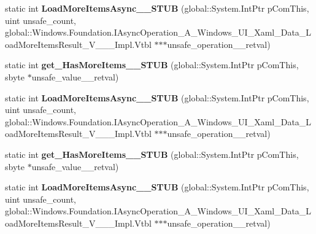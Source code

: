 \begin{DoxyCompactItemize}
static int {\bfseries Load\+More\+Items\+Async\+\_\+\+\_\+\+S\+T\+UB} (global\+::\+System.\+Int\+Ptr p\+Com\+This, uint unsafe\+\_\+count, global\+::\+Windows.\+Foundation.\+I\+Async\+Operation\+\_\+\+A\+\_\+\+Windows\+\_\+\+U\+I\+\_\+\+Xaml\+\_\+\+Data\+\_\+\+Load\+More\+Items\+Result\+\_\+\+V\+\_\+\+\_\+\+\_\+\+Impl.\+Vtbl $\ast$$\ast$$\ast$unsafe\+\_\+operation\+\_\+\+\_\+retval)
\item 
\mbox{\label{struct_windows_1_1_u_i_1_1_xaml_1_1_data_1_1_i_support_incremental_loading_____impl_1_1_vtbl_ae881f5715c03ffea730fd44d74b4735e}} 
static int {\bfseries get\+\_\+\+Has\+More\+Items\+\_\+\+\_\+\+S\+T\+UB} (global\+::\+System.\+Int\+Ptr p\+Com\+This, sbyte $\ast$unsafe\+\_\+value\+\_\+\+\_\+retval)
\item 
\mbox{\label{struct_windows_1_1_u_i_1_1_xaml_1_1_data_1_1_i_support_incremental_loading_____impl_1_1_vtbl_a40d8957bf7163031d2d5247bc6fc8ef7}} 
static int {\bfseries Load\+More\+Items\+Async\+\_\+\+\_\+\+S\+T\+UB} (global\+::\+System.\+Int\+Ptr p\+Com\+This, uint unsafe\+\_\+count, global\+::\+Windows.\+Foundation.\+I\+Async\+Operation\+\_\+\+A\+\_\+\+Windows\+\_\+\+U\+I\+\_\+\+Xaml\+\_\+\+Data\+\_\+\+Load\+More\+Items\+Result\+\_\+\+V\+\_\+\+\_\+\+\_\+\+Impl.\+Vtbl $\ast$$\ast$$\ast$unsafe\+\_\+operation\+\_\+\+\_\+retval)
\item 
\mbox{\label{struct_windows_1_1_u_i_1_1_xaml_1_1_data_1_1_i_support_incremental_loading_____impl_1_1_vtbl_ae881f5715c03ffea730fd44d74b4735e}} 
static int {\bfseries get\+\_\+\+Has\+More\+Items\+\_\+\+\_\+\+S\+T\+UB} (global\+::\+System.\+Int\+Ptr p\+Com\+This, sbyte $\ast$unsafe\+\_\+value\+\_\+\+\_\+retval)
\item 
\mbox{\label{struct_windows_1_1_u_i_1_1_xaml_1_1_data_1_1_i_support_incremental_loading_____impl_1_1_vtbl_a40d8957bf7163031d2d5247bc6fc8ef7}} 
static int {\bfseries Load\+More\+Items\+Async\+\_\+\+\_\+\+S\+T\+UB} (global\+::\+System.\+Int\+Ptr p\+Com\+This, uint unsafe\+\_\+count, global\+::\+Windows.\+Foundation.\+I\+Async\+Operation\+\_\+\+A\+\_\+\+Windows\+\_\+\+U\+I\+\_\+\+Xaml\+\_\+\+Data\+\_\+\+Load\+More\+Items\+Result\+\_\+\+V\+\_\+\+\_\+\+\_\+\+Impl.\+Vtbl $\ast$$\ast$$\ast$unsafe\+\_\+operation\+\_\+\+\_\+retval)

\end{DoxyCompactItemize}
